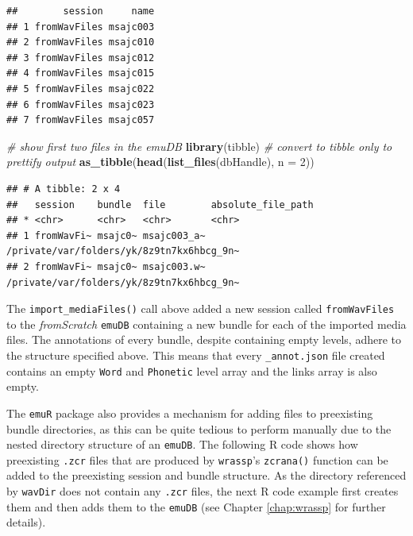 \documentclass[]{book}
\newenvironment{Shaded}{\begin{snugshade}}{\end{snugshade}}
\newcommand{\CommentTok}[1]{\textcolor[rgb]{0.56,0.35,0.01}{\textit{#1}}}
\newcommand{\DataTypeTok}[1]{\textcolor[rgb]{0.13,0.29,0.53}{#1}}
\newcommand{\DecValTok}[1]{\textcolor[rgb]{0.00,0.00,0.81}{#1}}
\newcommand{\KeywordTok}[1]{\textcolor[rgb]{0.13,0.29,0.53}{\textbf{#1}}}
\newcommand{\NormalTok}[1]{#1}
\theoremstyle{definition}
\theoremstyle{definition}
\theoremstyle{definition}
\theoremstyle{remark}
\begin{document}
\begin{verbatim}
##        session     name
## 1 fromWavFiles msajc003
## 2 fromWavFiles msajc010
## 3 fromWavFiles msajc012
## 4 fromWavFiles msajc015
## 5 fromWavFiles msajc022
## 6 fromWavFiles msajc023
## 7 fromWavFiles msajc057
\end{verbatim}

\begin{Shaded}
\begin{Highlighting}[]
\CommentTok{# show first two files in the emuDB}
\KeywordTok{library}\NormalTok{(tibble) }\CommentTok{# convert to tibble only to prettify output}
\KeywordTok{as_tibble}\NormalTok{(}\KeywordTok{head}\NormalTok{(}\KeywordTok{list_files}\NormalTok{(dbHandle), }\DataTypeTok{n =} \DecValTok{2}\NormalTok{))}
\end{Highlighting}
\end{Shaded}

\begin{verbatim}
## # A tibble: 2 x 4
##   session    bundle  file        absolute_file_path                       
## * <chr>      <chr>   <chr>       <chr>                                    
## 1 fromWavFi~ msajc0~ msajc003_a~ /private/var/folders/yk/8z9tn7kx6hbcg_9n~
## 2 fromWavFi~ msajc0~ msajc003.w~ /private/var/folders/yk/8z9tn7kx6hbcg_9n~
\end{verbatim}

The \texttt{import\_mediaFiles()} call above added a new session called
\texttt{fromWavFiles} to the \emph{fromScratch} \texttt{emuDB}
containing a new bundle for each of the imported media files. The
annotations of every bundle, despite containing empty levels, adhere to
the structure specified above. This means that every
\texttt{\_annot.json} file created contains an empty \texttt{Word} and
\texttt{Phonetic} level array and the links array is also empty.

The \texttt{emuR} package also provides a mechanism for adding files to
preexisting bundle directories, as this can be quite tedious to perform
manually due to the nested directory structure of an \texttt{emuDB}. The
following R code shows how preexisting \texttt{.zcr} files that are
produced by \texttt{wrassp}'s \texttt{zcrana()} function can be added to
the preexisting session and bundle structure. As the directory
referenced by \texttt{wavDir} does not contain any \texttt{.zcr} files,
the next R code example first creates them and then adds them to the
\texttt{emuDB} (see Chapter \ref{chap:wrassp} for further details).
\end{document}
